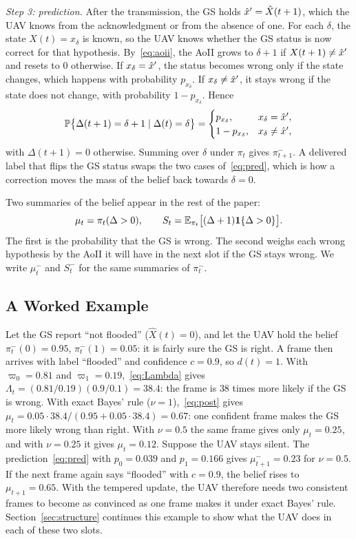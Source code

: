 \emph{Step 3: prediction.} After the transmission, the GS holds $\hat{x}'=\hat X(t+1)$, which the UAV knows from the acknowledgment or from the absence of one. For each $\delta$, the state $X(t)=x_\delta$ is known, so the UAV knows whether the GS status is now correct for that hypothesis. By~\eqref{eq:aoii}, the AoII grows to $\delta+1$ if $X(t+1)\neq\hat{x}'$ and resets to 0 otherwise. If $x_\delta=\hat{x}'$, the status becomes wrong only if the state changes, which happens with probability $p_{x_\delta}$. If $x_\delta\neq\hat{x}'$, it stays wrong if the state does not change, with probability $1-p_{x_\delta}$. Hence
\begin{equation}\label{eq:pred}
\mathbb{P}\big\{\Delta(t+1)=\delta+1\mid\Delta(t)=\delta\big\}=\begin{cases}p_{x_\delta}, & x_\delta=\hat{x}',\\ 1-p_{x_\delta}, & x_\delta\neq\hat{x}',\end{cases}
\end{equation}
with $\Delta(t+1)=0$ otherwise. Summing over $\delta$ under $\pi_t$ gives $\pi^-_{t+1}$. A delivered label that flips the GS status swaps the two cases of~\eqref{eq:pred}, which is how a correction moves the mass of the belief back towards $\delta=0$.

Two summaries of the belief appear in the rest of the paper:
\begin{equation}\label{eq:musum}
\mu_t=\pi_t(\Delta>0),\qquad S_t=\mathbb{E}_{\pi_t}\big[(\Delta+1)\mathbf{1}\{\Delta>0\}\big].
\end{equation}
The first is the probability that the GS is wrong. The second weighs each wrong hypothesis by the AoII it will have in the next slot if the GS stays wrong. We write $\mu^-_t$ and $S^-_t$ for the same summaries of $\pi^-_t$.

\subsection{A Worked Example}
\begin{example}\label{ex:belief}
Let the GS report ``not flooded'' ($\hat X(t)=0$), and let the UAV hold the belief $\pi^-_t(0)=0.95$, $\pi^-_t(1)=0.05$: it is fairly sure the GS is right. A frame then arrives with label ``flooded'' and confidence $c=0.9$, so $d(t)=1$. With $\varpi_0=0.81$ and $\varpi_1=0.19$,~\eqref{eq:Lambda} gives $\Lambda_t=(0.81/0.19)(0.9/0.1)=38.4$: the frame is $38$ times more likely if the GS is wrong. With exact Bayes' rule ($\nu=1$),~\eqref{eq:post} gives $\mu_t=0.05\cdot38.4/(0.95+0.05\cdot38.4)=0.67$: one confident frame makes the GS more likely wrong than right. With $\nu=0.5$ the same frame gives only $\mu_t=0.25$, and with $\nu=0.25$ it gives $\mu_t=0.12$. Suppose the UAV stays silent. The prediction~\eqref{eq:pred} with $p_0=0.039$ and $p_1=0.166$ gives $\mu^-_{t+1}=0.23$ for $\nu=0.5$. If the next frame again says ``flooded'' with $c=0.9$, the belief rises to $\mu_{t+1}=0.65$. With the tempered update, the UAV therefore needs two consistent frames to become as convinced as one frame makes it under exact Bayes' rule. Section~\ref{sec:structure} continues this example to show what the UAV does in each of these two slots.
\end{example}

